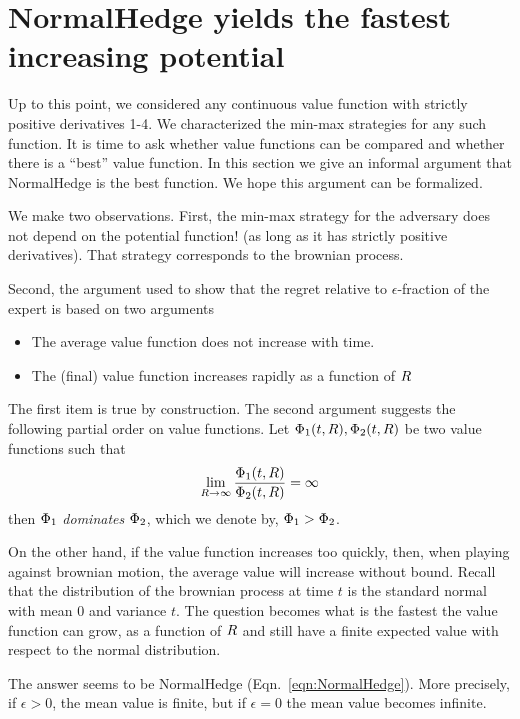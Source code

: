 \documentclass{article}[12pt]
\begin{document}
\section{NormalHedge yields the fastest increasing potential}

Up to this point, we considered any continuous value function with
strictly positive derivatives 1-4. We characterized the min-max
strategies for any such function. It is time to ask whether value
functions can be compared and whether there is a ``best'' value
function. In this section we give an informal argument that
NormalHedge is the best function. We hope this argument can be
formalized.

We make two observations. First, the min-max strategy for the
adversary does not depend on the potential function! (as long as it
has strictly positive derivatives). That strategy corresponds to the
brownian process.

Second, the argument used to show that the regret relative to
$\epsilon$-fraction of the expert is based on two arguments
\begin{itemize}
\item The average value function does not increase with time.
\item The (final) value function increases rapidly as a function of $R$
\end{itemize}
The first item is true by construction. The second argument suggests
the following partial order on value functions. Let
$\Phi_1(t,R),\Phi_2(t,R)$ be two value functions such that
\[
\lim_{R \to \infty} \frac{\Phi_1(t,R)}{\Phi_2(t,R)} = \infty  
\]
then $\Phi_1$ {\em dominates} $\Phi_2$, which we denote by, $\Phi_1 > \Phi_2$.

On the other hand, if the value function increases too quickly, then,
when playing against brownian motion, the average value will increase
without bound.  Recall that the distribution of the brownian process
at time $t$ is the standard normal with mean 0 and variance $t$.
The question becomes what is the fastest the value
function can grow, as a function of $R$ and still have a finite
expected value with respect to the normal distribution.

The answer seems to be NormalHedge (Eqn.~\ref{eqn:NormalHedge}). More
precisely, if $\epsilon>0$, the mean value is finite, but if
$\epsilon=0$ the mean value becomes infinite.



\end{document}
